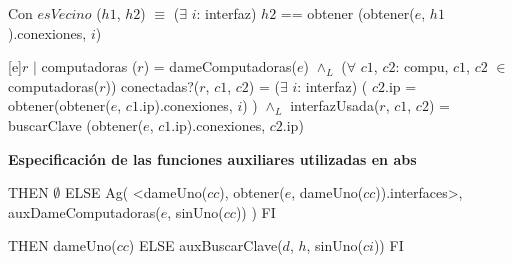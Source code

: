 \begin{Representacion}
Con $esVecino$ ($h1$, $h2$) $\equiv$  ($\exists$ $i$: interfaz) $h2$ == obtener (obtener($e$, $h1$).conexiones, $i$) 

\textbf{}
\textbf{}

[e]{$r$ $|$ computadoras ($r$) = dameComputadoras($e$) $\wedge_L$ \newline
	($\forall$ $c1$, $c2$: compu, $c1$, $c2$ $\in$ computadoras($r$)) conectadas?($r$, $c1$, $c2$) = ($\exists$ $i$: interfaz) ( $c2$.ip = obtener(obtener($e$, $c1$.ip).conexiones, $i$) ) $\wedge_L$ \newline
	interfazUsada($r$, $c1$, $c2$) = buscarClave (obtener($e$, $c1$.ip).conexiones, $c2$.ip)	
	}

\textbf{} %

\newpage

\textbf{Especificaci\'on de las funciones auxiliares utilizadas en abs}




{  
THEN {$\emptyset$}
ELSE {Ag( <dameUno($cc$), obtener($e$, dameUno($cc$)).interfaces>, auxDameComputadoras($e$, sinUno($cc$)) )}
FI}

{  
THEN {dameUno($cc$)}
ELSE {auxBuscarClave($d$, $h$, sinUno($ci$))}
FI}

\end{Representacion}

\newpage

